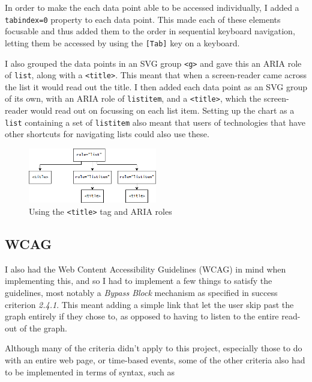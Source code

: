 \documentclass[ %
                    author={Aleena Baig},
                supervisor={Dr Simon Lock},
                    degree={BSc},
                     title={On Making Web Accessible Graphs},
                  subtitle={},
                      year={2019} ]{dissertation}
\begin{document}
In order to make the each data point able to be accessed individually, I added a \texttt{tabindex=0} property to each data point. This made each of these elements focusable and thus added them to the order in sequential keyboard navigation, letting them be accessed by using the \texttt{[Tab]} key on a keyboard.

I also grouped the data points in an SVG group \texttt{<g>} and gave this an ARIA role of \texttt{list}, along with a \texttt{<title>}. This meant that when a screen-reader came across the list it would read out the title. I then added each data point as an SVG group of its own, with an ARIA role of \texttt{listitem}, and a \texttt{<title>}, which the screen-reader would read out on focussing on each list item. Setting up the chart as a \texttt{list} containing a set of \texttt{listitem} also meant that users of technologies that have other shortcuts for navigating lists could also use these.

\begin{figure}[h]
\caption{Using the \texttt{<title>} tag and ARIA roles}
\centering
\includegraphics[width=0.5\textwidth]{images/listitemnesting.png}
\end{figure}

\subsection{WCAG}

I also had the Web Content Accessibility Guidelines (WCAG) in mind when implementing this, and so I had to implement a few things to satisfy the guidelines, most notably a \textit{Bypass Block} mechanism as specified in success criterion \textit{2.4.1}. This meant adding a simple link that let the user skip past the graph entirely if they chose to, as opposed to having to listen to the entire read-out of the graph.

Although many of the criteria didn't apply to this project, especially those to do with an entire web page, or time-based events, some of the other criteria also had to be implemented in terms of syntax, such as
\end{document}
